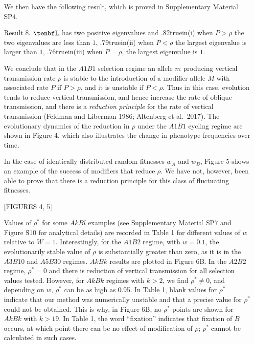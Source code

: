  \smallskip
 
We then have the following result, which is proved in Supplementary Material SP4.
 
 \proclaim Result 8. $\cl$ has two positive eigenvalues and\hfil\break
  {\hglue.82truein}(i) when $P>\rho$ the two eigenvalues are less than $1$,\hfil\break
  {\hglue.79truein}(ii) when $P<\rho$ the largest eigenvalue is larger than $1$,\hfil\break
  {\hglue.76truein}(iii) when $P=\rho$, the largest eigenvalue is $1$.\par
  

 We conclude that in the $A1B1$ selection regime an allele $m$ producing vertical transmission rate $\rho$ is stable to the introduction of a modifier allele $M$ with associated rate $P$ if $P>\rho$, and it is unstable if $P<\rho$. Thus in this case, evolution tends to reduce vertical transmission, and hence increase the rate of oblique transmission,  and there is a {\sl reduction principle} for the rate of vertical transmission (Feldman and Liberman 1986; Altenberg et al.\ 2017). The evolutionary dynamics of the reduction in $\rho$ under the $A1B1$ cycling regime are shown in Figure 4, which also illustrates the change in phenotype frequencies over time. 
 
 In the case of identically distributed random fitnesses $w_A$ and $w_B$, Figure 5 shows  an example of the success of modifiers that reduce $\rho$. We have not, however, been able to prove that there is a reduction principle for this class of fluctuating fitnesses.
  
 
  \medskip
\centerline{[FIGURES 4, 5]}  

Values of $\rho^*$ for some $AkBl$ examples (see Supplementary Material SP7 and  Figure S10 for analytical details) are recorded in Table 1 for different values of $w$ relative to $W=1$. Interestingly, for the $A1B2$ regime, with $w=0.1$, the evolutionarily stable value of $\rho$ is substantially greater than zero, as it is in the $A3B10$ and $A5B30$ regimes.
$AkBk$ results are plotted in Figure 6B. In the $A2B2$ regime, $\rho^* =0$ and there is reduction of vertical transmission for all selection values tested. However, for $AkBk$ regimes with $k>2$, we find $\rho^*\ne 0$, and depending on $w$, $\rho^*$ can be as high as 0.95. In Table 1, blank values for $\rho^*$ indicate that our method was numerically unstable  and that a precise value for $\rho^*$ could not be obtained. This is why, in Figure 6B, no $\rho^*$ points are shown for $AkBk$ with $k>19$. In Table 1, the word ``fixation'' indicates that fixation of $B$ occurs, at which point there can be no effect of modification of $\rho$; $\rho^*$ cannot be calculated in such cases.
\bigskip\bigskip

